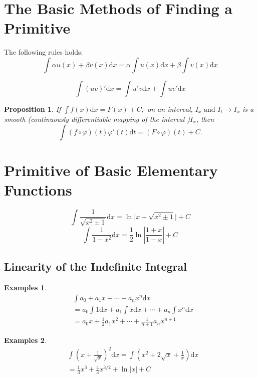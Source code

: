 \documentclass[a4paper,12pt]{article} %
\newtheorem{proposition}{Proposition}[section]
\newtheorem{example}{Examples}
\begin{document}
\section{\rm \textbf{The Basic Methods of Finding a Primitive}}
The following rules holds:
\begin{equation}
    \int \alpha u(x) + \beta v(x) \mathrm{d}x = \alpha \int u(x)\mathrm{d}x + 
    \beta \int v(x)\mathrm{d}x
\end{equation}

\begin{equation}
    \int \left(uv\right)'\mathrm{d}x = \int u'v\mathrm{d}x + \int uv'\mathrm{d}x
\end{equation}

\begin{proposition}
    \normalfont
    If $\int f(x)\mathrm{d}x = F(x) + C,$ on an interval,
    $ I_x \text{ and } I_t \to I_x $ is a smooth (continuously 
    differentiable mapping of the interval )$ I_x$, then
    \[
        \int (f\circ\varphi)(t)\varphi'(t)\mathrm{d}t = (F\circ\varphi)(t) + C.
        \]
\end{proposition}

\section{\rm \textbf{Primitive of Basic Elementary Functions}}
\[
    \int \frac{1}{\sqrt{x^2\pm 1}}\mathrm{d}x = \ln \vert x + \sqrt{x^2 \pm 1} \vert + C
    \]
\[
    \int \frac{1}{1 - x^2} \mathrm{d}x = \frac{1}{2}\ln\left\vert \frac{1+x}{1-x}
    \right\vert + C
    \]

\subsection{Linearity of the Indefinite Integral}
\begin{example}
    \[
        \begin{split}
            &\int a_0 + a_1x + \cdots + a_nx^n\mathrm{d}x \\
            & = a_0 \int 1\mathrm{d}x + a_1\int x\mathrm{d}x + \cdots + 
             a_n\int x^n \mathrm{d}x \\
            & = a_0x + \frac{1}{2}a_1x^2 + \cdots + \frac{1}{n+1}a_nx^{n+1}
        \end{split}
            \]
\end{example}

\begin{example}
    \[
        \begin{split}
            & \int \left(x + \frac{1}{\sqrt{x}}\right)^2\mathrm{d}x = 
        \int \left(x^2 + 2\sqrt{x} + \frac{1}{x}\right)\mathrm{d}x \\
            & = \frac{1}{3}x^3 + \frac{4}{3}x^{3/2} + \ln \vert x \vert +C
        \end{split}
        \]
\end{example}
\end{document}
